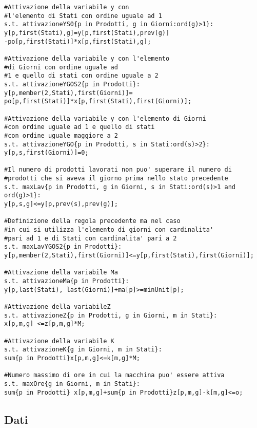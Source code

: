 \documentclass[12pt]{article}
\begin{document}
\begin{lstlisting}
#Attivazione della variabile y con 
#l'elemento di Stati con ordine uguale ad 1
s.t. attivazioneYS0{p in Prodotti, g in Giorni:ord(g)>1}:
y[p,first(Stati),g]=y[p,first(Stati),prev(g)]
-po[p,first(Stati)]*x[p,first(Stati),g];

#Attivazione della variabile y con l'elemento 
#di Giorni con ordine uguale ad 
#1 e quello di stati con ordine uguale a 2
s.t. attivazioneYGOS2{p in Prodotti}:
y[p,member(2,Stati),first(Giorni)]=
po[p,first(Stati)]*x[p,first(Stati),first(Giorni)];

#Attivazione della variabile y con l'elemento di Giorni 
#con ordine uguale ad 1 e quello di stati 
#con ordine uguale maggiore a 2
s.t. attivazioneYGO{p in Prodotti, s in Stati:ord(s)>2}:
y[p,s,first(Giorni)]=0;

#Il numero di prodotti lavorati non puo' superare il numero di 
#prodotti che si aveva il giorno prima nello stato precedente
s.t. maxLav{p in Prodotti, g in Giorni, s in Stati:ord(s)>1 and ord(g)>1}: 
y[p,s,g]<=y[p,prev(s),prev(g)]; 

#Definizione della regola precedente ma nel caso 
#in cui si utilizza l'elemento di giorni con cardinalita' 
#pari ad 1 e di Stati con cardinalita' pari a 2
s.t. maxLavYGOS2{p in Prodotti}:
y[p,member(2,Stati),first(Giorni)]<=y[p,first(Stati),first(Giorni)];

#Attivazione della variabile Ma
s.t. attivazioneMa{p in Prodotti}:
y[p,last(Stati), last(Giorni)]+ma[p]>=minUnit[p];

#Attivazione della variabileZ
s.t. attivazioneZ{p in Prodotti, g in Giorni, m in Stati}:
x[p,m,g] <=z[p,m,g]*M;

#Attivazione della variabile K
s.t. attivazioneK{g in Giorni, m in Stati}:
sum{p in Prodotti}x[p,m,g]<=k[m,g]*M;

#Numero massimo di ore in cui la macchina puo' essere attiva
s.t. maxOre{g in Giorni, m in Stati}:
sum{p in Prodotti} x[p,m,g]+sum{p in Prodotti}z[p,m,g]-k[m,g]<=o;

\end{lstlisting}
\subsection{Dati}
\end{document}
